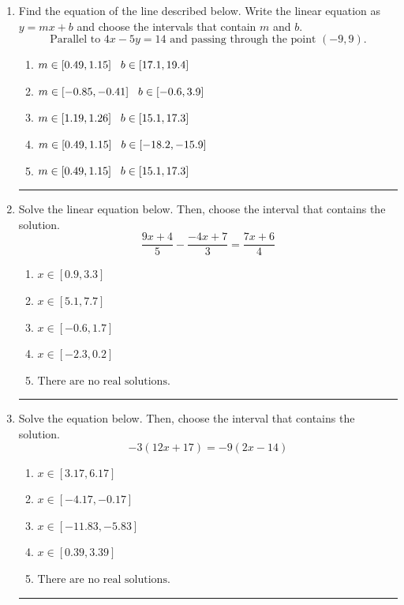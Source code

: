 \documentclass[14pt]{extbook}
\newcommand{\litem}[1]{\item#1\hspace*{-1cm}\rule{\textwidth}{0.4pt}}
\begin{document}
\begin{enumerate}
\litem{
Find the equation of the line described below. Write the linear equation as $ y=mx+b $ and choose the intervals that contain $m$ and $b$.\[ \text{Parallel to } 4 x - 5 y = 14 \text{ and passing through the point } (-9, 9). \]\begin{enumerate}[label=\Alph*.]
\item \( m \in [0.49, 1.15] \hspace*{3mm} b \in [17.1, 19.4] \)
\item \( m \in [-0.85, -0.41] \hspace*{3mm} b \in [-0.6, 3.9] \)
\item \( m \in [1.19, 1.26] \hspace*{3mm} b \in [15.1, 17.3] \)
\item \( m \in [0.49, 1.15] \hspace*{3mm} b \in [-18.2, -15.9] \)
\item \( m \in [0.49, 1.15] \hspace*{3mm} b \in [15.1, 17.3] \)

\end{enumerate} }
\litem{
Solve the linear equation below. Then, choose the interval that contains the solution.\[ \frac{9x + 4}{5} - \frac{-4x + 7}{3} = \frac{7x + 6}{4} \]\begin{enumerate}[label=\Alph*.]
\item \( x \in [0.9, 3.3] \)
\item \( x \in [5.1, 7.7] \)
\item \( x \in [-0.6, 1.7] \)
\item \( x \in [-2.3, 0.2] \)
\item \( \text{There are no real solutions.} \)

\end{enumerate} }
\litem{
Solve the equation below. Then, choose the interval that contains the solution.\[ -3(12x + 17) = -9(2x -14) \]\begin{enumerate}[label=\Alph*.]
\item \( x \in [3.17, 6.17] \)
\item \( x \in [-4.17, -0.17] \)
\item \( x \in [-11.83, -5.83] \)
\item \( x \in [0.39, 3.39] \)
\item \( \text{There are no real solutions.} \)


\end{enumerate}}
\end{enumerate}
\end{document}
